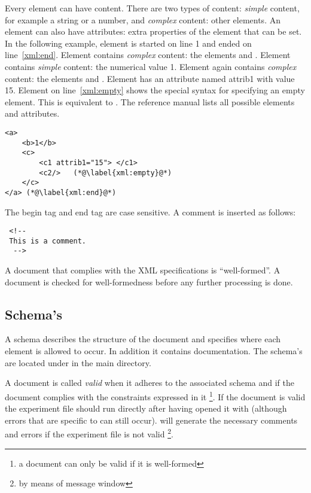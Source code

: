 {Every element can have content. There are two types of content:
\emph{simple} content, for example a string or a number, and
\emph{complex} content: other elements. An element can also have
attributes: extra properties of the element that can be set.
 In the following example, element  is started
on line 1 and ended on line~\ref{xml:end}. Element 
contains \emph{complex} content: the elements  and
. Element  contains \emph{simple} content:
the numerical value 1. Element  again contains
\emph{complex} content: the elements  and
. Element  has an attribute named attrib1
with value 15. Element  on line~\ref{xml:empty} shows
the special syntax for specifying an empty element. This is
equivalent to . The reference manual lists all
possible elements and attributes.

\begin{lstlisting}
<a>
    <b>1</b>
    <c>
        <c1 attrib1="15"> </c1>
        <c2/>   (*@\label{xml:empty}@*)
    </c>
</a> (*@\label{xml:end}@*)
\end{lstlisting}

The begin tag and end tag are case sensitive. A comment is
inserted as follows:
\begin{lstlisting}
 <!--
 This is a comment.
  -->
\end{lstlisting}





A document that complies with the XML specifications is
``well-formed''. A document is checked for well-formedness before
any further processing is done.

\subsection{Schema's}
A schema describes the structure of the document and specifies
where each element is allowed to occur. In addition it contains
documentation. The \apex schema's are located under
 in the main \apex directory.

A document is called \emph {valid} when it adheres to the
associated schema and if the document complies with the
constraints expressed in it \footnote{a document can only be valid
if it is well-formed}. If the document is valid the experiment
file should run directly after having opened it with \apex
(although errors that are specific to \apex can still occur).
\apex will generate the necessary comments and errors if the
experiment file is not valid \footnote{by means of message
window}.

}
